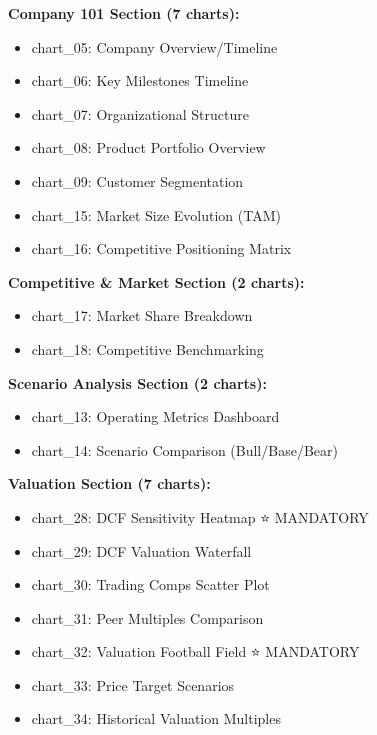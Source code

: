 \documentclass[11pt]{article}
\begin{document}
\textbf{Company 101 Section (7 charts):}

\begin{itemize}[leftmargin=*,itemsep=2pt,topsep=2pt]
\item {} chart\_\allowbreak{}05: Company Overview/Timeline
\item {} chart\_\allowbreak{}06: Key Milestones Timeline
\item {} chart\_\allowbreak{}07: Organizational Structure
\item {} chart\_\allowbreak{}08: Product Portfolio Overview
\item {} chart\_\allowbreak{}09: Customer Segmentation
\item {} chart\_\allowbreak{}15: Market Size Evolution (TAM)
\item {} chart\_\allowbreak{}16: Competitive Positioning Matrix
\end{itemize}

\textbf{Competitive \& Market Section (2 charts):}

\begin{itemize}[leftmargin=*,itemsep=2pt,topsep=2pt]
\item {} chart\_\allowbreak{}17: Market Share Breakdown
\item {} chart\_\allowbreak{}18: Competitive Benchmarking
\end{itemize}

\textbf{Scenario Analysis Section (2 charts):}

\begin{itemize}[leftmargin=*,itemsep=2pt,topsep=2pt]
\item {} chart\_\allowbreak{}13: Operating Metrics Dashboard
\item {} chart\_\allowbreak{}14: Scenario Comparison (Bull/Base/Bear)
\end{itemize}

\textbf{Valuation Section (7 charts):}

\begin{itemize}[leftmargin=*,itemsep=2pt,topsep=2pt]
\item {} chart\_\allowbreak{}28: DCF Sensitivity Heatmap ⭐ MANDATORY
\item {} chart\_\allowbreak{}29: DCF Valuation Waterfall
\item {} chart\_\allowbreak{}30: Trading Comps Scatter Plot
\item {} chart\_\allowbreak{}31: Peer Multiples Comparison
\item {} chart\_\allowbreak{}32: Valuation Football Field ⭐ MANDATORY
\item {} chart\_\allowbreak{}33: Price Target Scenarios
\item {} chart\_\allowbreak{}34: Historical Valuation Multiples
\end{itemize}
\end{document}
